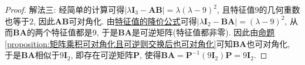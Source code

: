 \documentclass[../../main.tex]{subfiles}
\begin{document}
\begin{proof}
{\color{blue}解法三:}
经简单的计算可得\(|\lambda\boldsymbol{I}_3 - \boldsymbol{A}\boldsymbol{B}| = \lambda(\lambda - 9)^2\), 且特征值\(9\)的几何重数也等于\(2\), 因此\(\boldsymbol{A}\boldsymbol{B}\)可对角化. 由\hyperref[theorem:特征值的降价公式]{特征值的降价公式}可得\(|\lambda\boldsymbol{I}_2 - \boldsymbol{B}\boldsymbol{A}| = (\lambda - 9)^2\), 从而\(\boldsymbol{B}\boldsymbol{A}\)的两个特征值都是\(9\), 于是\(\boldsymbol{B}\boldsymbol{A}\)是可逆矩阵(特征值都非零). 因此由\hyperref[proposition:矩阵乘积可对角化且可逆则交换后也可对角化]{命题\ref{proposition:矩阵乘积可对角化且可逆则交换后也可对角化}}可知\(\boldsymbol{B}\boldsymbol{A}\)也可对角化, 于是\(\boldsymbol{B}\boldsymbol{A}\)相似于\(9\boldsymbol{I}_2\), 即存在可逆矩阵\(\boldsymbol{P}\), 使得\(\boldsymbol{B}\boldsymbol{A} = \boldsymbol{P}^{-1}(9\boldsymbol{I}_2)\boldsymbol{P} = 9\boldsymbol{I}_2\). 
\end{proof}
\end{document}
